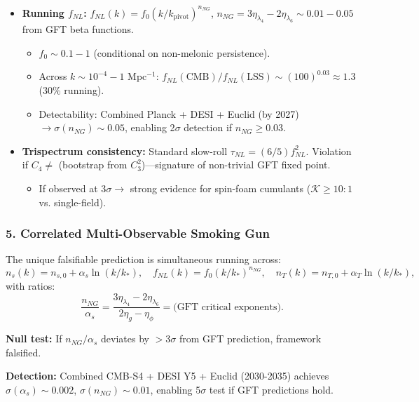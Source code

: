 \documentclass[12pt,a4paper]{article}
\begin{document}
\begin{itemize}
\item \textbf{Running \(f_{NL}\):} \(f_{NL}(k) = f_0 (k/k_{\text{pivot}})^{n_{NG}}\), \(n_{NG} = 3\eta_{\lambda_4} - 2\eta_{\lambda_6} \sim 0.01-0.05\) from GFT beta functions.
\begin{itemize}
\item \(f_0 \sim 0.1-1\) (conditional on non-melonic persistence).
\item Across \(k \sim 10^{-4} - 1\) Mpc\(^{-1}\): \(f_{NL}(\text{CMB}) / f_{NL}(\text{LSS}) \sim (100)^{0.03} \approx 1.3\) (30\% running).
\item Detectability: Combined Planck + DESI + Euclid (by 2027) \(\to \sigma(n_{NG}) \sim 0.05\), enabling 2\(\sigma\) detection if \(n_{NG} \geq 0.03\).
\end{itemize}

\item \textbf{Trispectrum consistency:} Standard slow-roll \(\tau_{NL} = (6/5) f_{NL}^2\). Violation if \(C_4 \neq\) (bootstrap from \(C_3^2\))—signature of non-trivial GFT fixed point.
\begin{itemize}
\item If observed at 3\(\sigma \to\) strong evidence for spin-foam cumulants (\(\mathcal{K} \geq 10:1\) vs. single-field).
\end{itemize}
\end{itemize}

\subsubsection{5. Correlated Multi-Observable Smoking Gun}

The unique falsifiable prediction is simultaneous running across:
\begin{equation}
n_s(k) = n_{s,0} + \alpha_s \ln(k/k_*), \quad f_{NL}(k) = f_0 (k/k_*)^{n_{NG}}, \quad n_T(k) = n_{T,0} + \alpha_T \ln(k/k_*),
\end{equation}
with ratios:
\begin{equation}
\frac{n_{NG}}{\alpha_s} = \frac{3\eta_{\lambda_4} - 2\eta_{\lambda_6}}{2\eta_g - \eta_\phi} = \text{(GFT critical exponents)}.
\end{equation}

\textbf{Null test:} If \(n_{NG}/\alpha_s\) deviates by \(> 3\sigma\) from GFT prediction, framework falsified.

\textbf{Detection:} Combined CMB-S4 + DESI Y5 + Euclid (2030-2035) achieves \(\sigma(\alpha_s) \sim 0.002\), \(\sigma(n_{NG}) \sim 0.01\), enabling 5\(\sigma\) test if GFT predictions hold.
\end{document}
